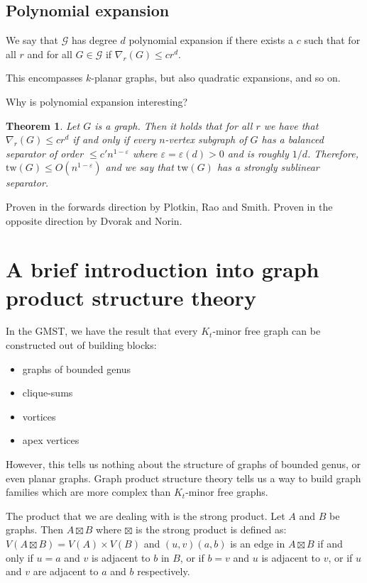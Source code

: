 \documentclass[]{article}
\newcommand{\tw}{\text{tw}}
\newtheorem{theorem}{Theorem}
\theoremstyle{definition}
\numberwithin{theorem}{section}
\numberwithin{equation}{section}
\begin{document}
\subsection{Polynomial expansion}
We say that $\mathcal{G}$ has degree $d$ polynomial expansion if there exists a $c$ such that for all $r $ and for all $G \in \mathcal{G}$ if $\nabla_r(G) \leq cr^d$. 

This encompasses $k$-planar graphs, but also quadratic expansions, and so on.

Why is polynomial expansion interesting?

\begin{theorem}
	Let $G$ is a graph. Then it holds that for all $r$ we have that $\nabla_r(G) \leq c r^d$ if and only if every $n$-vertex subgraph of $G$ has a balanced separator of order $\leq c' n^{1 - \varepsilon}$ where $\varepsilon = \varepsilon(d) > 0$ and is roughly $1/d$. Therefore, $\tw(G) \leq O(n^{1- \varepsilon})$ and we say that $\tw(G)$ has a strongly sublinear separator. 
\end{theorem}
Proven in the forwards direction by Plotkin, Rao and Smith.
Proven in the opposite direction by Dvorak and Norin. 

\section{A brief introduction into graph product structure theory}

In the GMST, we have the result that every $K_t$-minor free graph can be constructed out of building blocks:
\begin{itemize}
	\item graphs of bounded genus
	\item clique-sums
	\item vortices
	\item apex vertices
\end{itemize}
However, this tells us nothing about the structure of graphs of bounded genus, or even planar graphs. Graph product structure theory tells us a way to build graph families which are more complex than $K_t$-minor free graphs. 

The product that we are dealing with is the strong product. Let $A$ and $B$ be graphs. Then $A \boxtimes B$ where $\boxtimes$ is the strong product is defined as:
$V(A \boxtimes B) = V(A) \times V(B)$
and $(u,v)(a,b)$ is an edge in $A \boxtimes B$ if and only if $u = a$ and $ v$ is adjacent to $b$ in $B$, or if $b = v$ and $u $ is adjacent to $v$, or if $u$ and $v$ are adjacent to $a$ and $b$ respectively. 
\end{document}
